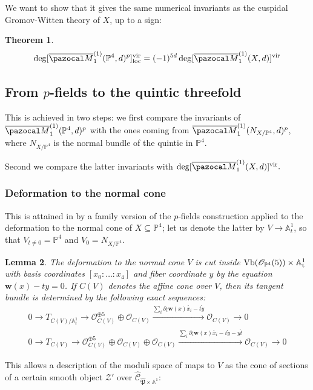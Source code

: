 \documentclass[11pt]{amsart}
\newcommand{\Mone}[3]{\overline{\pazocal M}^{(1)}_{#1}(#2,#3)}
\newcommand{\PP}{\mathbb P}
\newcommand{\OO}{\mathcal O}
\renewcommand{\to}{\rightarrow}
\newcommand{\Aaff}{\mathbb A}
\newcommand{\hC}{\widehat{\mathcal C}}
\newcommand{\hP}{\widehat{\mathfrak P}}
\newcommand{\w}{\mathbf{w}}
\theoremstyle{plain}
\newtheorem{thm}{Theorem}[section]
\newtheorem{lem}[thm]{Lemma}
\theoremstyle{definition}
\begin{document}
We want to show that it gives the same numerical invariants as the cuspidal Gromov-Witten theory of $X$, up to a sign:
\begin{thm}\label{thm:p-fields-quintic}
 \[\deg[\Mone{1}{\PP^4}{d}^p]^{\rm{vir}}_{\rm{loc}}= (-1)^{5d}\deg[\Mone{1}{X}{d}]^{\rm{vir}}\]%
\end{thm}

\subsection{From $p$-fields to the quintic threefold}
This is achieved in two steps: we first compare the invariants of $\Mone{1}{\PP^4}{d}^p$ with the ones coming from $\Mone{1}{N_{X/\PP^4}}{d}^p$, where $N_{X/\PP^4}$ is the normal bundle of the quintic in $\PP^4.$

Second we compare the latter invariants with $\deg[\Mone{1}{X}{d}]^{\rm{vir}}.$

\subsubsection*{Deformation to the normal cone}
This is attained in \cite[\S\S4-5]{CLpfields} by a family version of the $p$-fields construction applied to the deformation to the normal cone of $X\subseteq \PP^4$; let us denote the latter by $V\to\Aaff^1_t$, so that $V_{t\neq 0}=\PP^4$ and $V_0=N_{X/\PP^4}.$

\begin{lem}
 The deformation to the normal cone $V$ is cut inside $\rm{Vb}(\OO_{\PP^4}(5))\times\Aaff^1_t$ with basis coordinates $[x_0:\ldots:x_4]$ and fiber coordinate $y$ by the equation $\w(x)-ty=0$. If $C(V)$ denotes the affine cone over $V$, then its tangent bundle is determined by the following exact sequences:
 \begin{align}
  0\to T_{C(V)/\Aaff^1_t}\to\OO^{\oplus 5}_{C(V)}\oplus\OO_{C(V)}\xrightarrow{\sum_i\partial_i\w(x)\mathring{x_i}-t\mathring{y}}\OO_{C(V)}\to 0 \label{eq:reltangentcone}\\
    0\to T_{C(V)}\to\OO^{\oplus 5}_{C(V)}\oplus\OO_{C(V)}\oplus\OO_{C(V)}\xrightarrow{\sum_i\partial_i\w(x)\mathring{x_i}-t\mathring{y}-y\mathring{t}}\OO_{C(V)}\to 0\label{eq:tangentcone}
  \end{align}
\end{lem}
This allows a description of the moduli space of maps to $V$ as the cone of sections of a certain smooth object $\mathcal Z'$ over $\hC_{\hP\times\Aaff^1}$:
\end{document}
